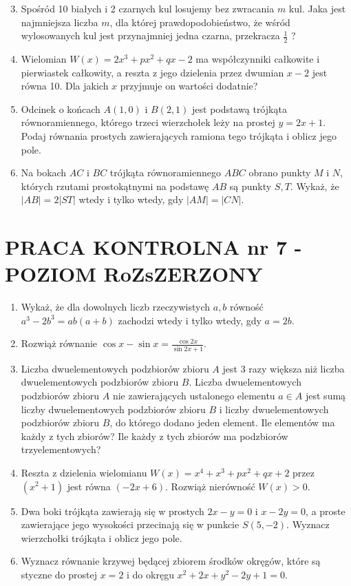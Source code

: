 \documentclass[10pt]{article}
\begin{document}
\begin{enumerate}
  \setcounter{enumi}{2}
  \item Spośród 10 białych i 2 czarnych kul losujemy bez zwracania $m$ kul. Jaka jest najmniejsza liczba $m$, dla której prawdopodobieństwo, że wśród wylosowanych kul jest przynajmniej jedna czarna, przekracza $\frac{1}{2}$ ?
  \item Wielomian $W(x)=2 x^{3}+p x^{2}+q x-2$ ma współczynniki całkowite i pierwiastek całkowity, a reszta z jego dzielenia przez dwumian $x-2$ jest równa 10. Dla jakich $x$ przyjmuje on wartości dodatnie?
  \item Odcinek o końcach $A(1,0)$ i $B(2,1)$ jest podstawą trójkąta równoramiennego, którego trzeci wierzchołek leży na prostej $y=2 x+1$. Podaj równania prostych zawierających ramiona tego trójkąta i oblicz jego pole.
  \item Na bokach $A C$ i $B C$ trójkąta równoramiennego $A B C$ obrano punkty $M$ i $N$, których rzutami prostokątnymi na podstawę $A B$ są punkty $S, T$. Wykaż, że $|A B|=2|S T|$ wtedy i tylko wtedy, gdy $|A M|=|C N|$.
\end{enumerate}

\section*{PRACA KONTROLNA nr 7 - POZIOM RoZsZERZONY}
\begin{enumerate}
  \item Wykaż, że dla dowolnych liczb rzeczywistych $a, b$ równość $a^{3}-2 b^{3}=a b(a+b)$ zachodzi wtedy i tylko wtedy, gdy $a=2 b$.
  \item Rozwiąż równanie $\cos x-\sin x=\frac{\cos 2 x}{\sin 2 x+1}$.
  \item Liczba dwuelementowych podzbiorów zbioru $A$ jest 3 razy większa niż liczba dwuelementowych podzbiorów zbioru $B$. Liczba dwuelementowych podzbiorów zbioru $A$ nie zawierających ustalonego elementu $a \in A$ jest sumą liczby dwuelementowych podzbiorów zbioru $B$ i liczby dwuelementowych podzbiorów zbioru $B$, do którego dodano jeden element. Ile elementów ma każdy z tych zbiorów? Ile każdy z tych zbiorów ma podzbiorów trzyelementowych?
  \item Reszta z dzielenia wielomianu $W(x)=x^{4}+x^{3}+p x^{2}+q x+2$ przez $\left(x^{2}+1\right)$ jest równa $(-2 x+6)$. Rozwiąż nierówność $W(x)>0$.
  \item Dwa boki trójkąta zawierają się w prostych $2 x-y=0$ i $x-2 y=0$, a proste zawierające jego wysokości przecinają się w punkcie $S(5,-2)$. Wyznacz wierzchołki trójkąta i oblicz jego pole.
  \item Wyznacz równanie krzywej będącej zbiorem środków okręgów, które są styczne do prostej $x=2$ i do okręgu $x^{2}+2 x+y^{2}-2 y+1=0$.
\end{enumerate}
\end{document}
